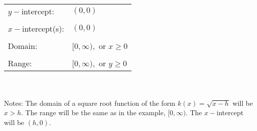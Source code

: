 \documentclass[12pt]{book}
\theoremstyle{definition}
\begin{document}
\ \par
\begin{tabular}{ll}
$y-$intercept: & $(0,0)$\\
&\\
$x-$intercept(s): & $(0,0)$\\
&\\
Domain: & $[0,\infty),$ or $x\geq 0$\\
&\\
Range: & $[0,\infty),$ or $y\geq 0$
\end{tabular}
\\
~\\

Notes: The domain of a square root function of the form $k(x)=\sqrt{x-h}$ will be $x>h$.  The range will be the same as in the example, $[0,\infty)$.  The $x-$intercept will be $(h,0)$. 

\newpage
\end{document}

